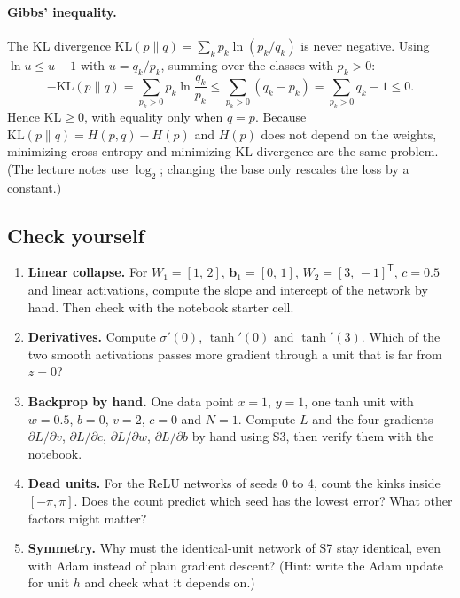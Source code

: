 \documentclass[11pt]{article}
\newcommand{\T}{\mathsf{T}}
\begin{document}
\paragraph{Gibbs' inequality.} The KL divergence $\mathrm{KL}(p\|q)=\sum_kp_k\ln(p_k/q_k)$ is never negative. Using $\ln u\le u-1$ with $u=q_k/p_k$, summing over the classes with $p_k>0$:
\[
  -\mathrm{KL}(p\|q)=\sum_{p_k>0}p_k\ln\frac{q_k}{p_k}
  \le\sum_{p_k>0}(q_k-p_k)=\sum_{p_k>0}q_k-1\le0 .
\]
Hence $\mathrm{KL}\ge0$, with equality only when $q=p$. Because $\mathrm{KL}(p\|q)=H(p,q)-H(p)$ and $H(p)$ does not depend on the weights, minimizing cross-entropy and minimizing KL divergence are the same problem. (The lecture notes use $\log_2$; changing the base only rescales the loss by a constant.)

\subsection*{Check yourself}
\begin{enumerate}
  \item \textbf{Linear collapse.} For $W_1=[1,\,2]$, $\mathbf b_1=[0,\,1]$, $W_2=[3,\,-1]^{\T}$, $c=0.5$ and linear activations, compute the slope and intercept of the network by hand. Then check with the notebook starter cell.
  \item \textbf{Derivatives.} Compute $\sigma'(0)$, $\tanh'(0)$ and $\tanh'(3)$. Which of the two smooth activations passes more gradient through a unit that is far from $z=0$?
  \item \textbf{Backprop by hand.} One data point $x=1$, $y=1$, one tanh unit with $w=0.5$, $b=0$, $v=2$, $c=0$ and $N=1$. Compute $L$ and the four gradients $\partial L/\partial v$, $\partial L/\partial c$, $\partial L/\partial w$, $\partial L/\partial b$ by hand using S3, then verify them with the notebook.
  \item \textbf{Dead units.} For the ReLU networks of seeds 0 to 4, count the kinks inside $[-\pi,\pi]$. Does the count predict which seed has the lowest error? What other factors might matter?
  \item \textbf{Symmetry.} Why must the identical-unit network of S7 stay identical, even with Adam instead of plain gradient descent? (Hint: write the Adam update for unit $h$ and check what it depends on.)
\end{enumerate}
\end{document}
